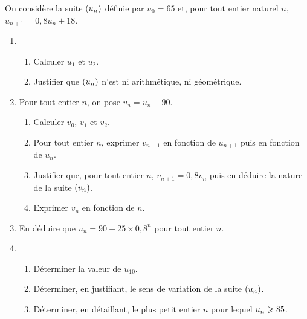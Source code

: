 \documentclass[a4paper,11pt]{article}
\begin{document}
On considère la suite $\suiten$ définie par $u_0=65$ et, pour tout entier naturel $n$, $u_{n+1}=0,8u_n+18$.
\begin{enumerate}
	\item 
	\begin{enumerate}
		\item Calculer $u_1$ et $u_2$.
		\item Justifier que $\suiten$ n'est ni arithmétique, ni géométrique.
	\end{enumerate}
	\item Pour tout entier $n$, on pose $v_n=u_n-90$.
	\begin{enumerate}
		\item Calculer $v_0$, $v_1$ et $v_2$.
		\item Pour tout entier $n$, exprimer $v_{n+1}$ en fonction de $u_{n+1}$ puis en fonction de $u_n$.
		\item Justifier que, pour tout entier $n$, $v_{n+1}=0,8v_n$ puis en déduire la nature de la suite $\suiten[v]$.
		\item Exprimer $v_n$ en fonction de $n$.
	\end{enumerate}
	\item En déduire que $u_n=90-25 \times 0,8^n$ pour tout entier $n$.
	\item 
	\begin{enumerate}
		\item Déterminer la valeur de $u_{10}$.
		\item Déterminer, en justifiant, le sens de variation de la suite $\suiten$.
		\item Déterminer, en détaillant, le plus petit entier $n$ pour lequel $u_n \pg 85$.
	\end{enumerate}
\end{enumerate}

\smallskip


\medskip
\end{document}
